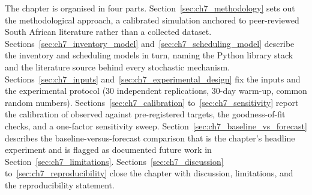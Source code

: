 The chapter is organised in four parts. Section~\ref{sec:ch7_methodology} sets out the methodological approach, a calibrated simulation anchored to peer-reviewed South African literature rather than a collected dataset. Sections~\ref{sec:ch7_inventory_model} and~\ref{sec:ch7_scheduling_model} describe the inventory and scheduling models in turn, naming the Python library stack and the literature source behind every stochastic mechanism. Sections~\ref{sec:ch7_inputs} and~\ref{sec:ch7_experimental_design} fix the inputs and the experimental protocol (30 independent replications, 30-day warm-up, common random numbers). Sections~\ref{sec:ch7_calibration} to~\ref{sec:ch7_sensitivity} report the calibration of observed against pre-registered targets, the goodness-of-fit checks, and a one-factor sensitivity sweep. Section~\ref{sec:ch7_baseline_vs_forecast} describes the baseline-versus-forecast comparison that is the chapter's headline experiment and is flagged as documented future work in Section~\ref{sec:ch7_limitations}. Sections~\ref{sec:ch7_discussion} to~\ref{sec:ch7_reproducibility} close the chapter with discussion, limitations, and the reproducibility statement.
